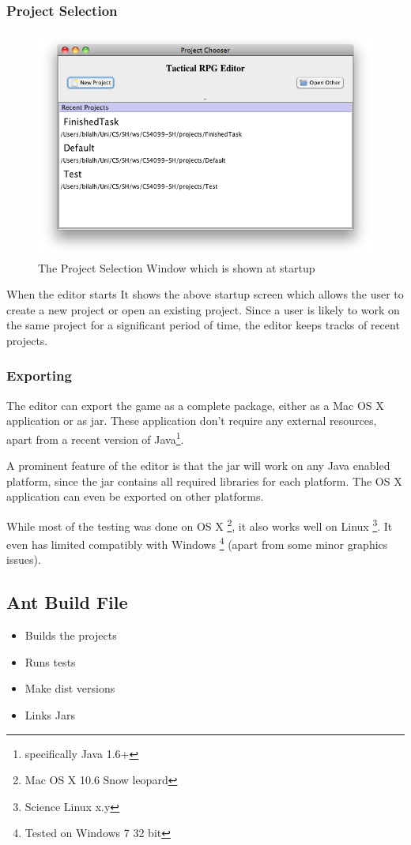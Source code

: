 \subsubsection{Project Selection}
\begin{figure}[htbp]
	\centering
		\includegraphics[width=1.05\textwidth]{figures/editor/Project_Selection.png}
	\caption{The Project Selection Window which is shown at startup}
	\label{fig:figures_editor_Project_Selection}
\end{figure}

When the editor starts It shows the above startup screen which allows the user to create a new project or open an existing project.  Since a user is likely to work on the same project for a significant period of time, the editor keeps tracks of recent projects. 

\clearpage
\subsubsection{Exporting}
\label{ssub:exporting}

The editor can export the game as a complete package, either as a Mac OS X application or as jar. These application don't require any external resources, apart from a recent version of Java\footnote{specifically Java 1.6+}.

A prominent feature of the editor is that the jar will work on any Java enabled platform, since the jar contains all required libraries for each platform. The OS X application can even be exported on other platforms.

While most of the testing was done on OS X \footnote{Mac OS X 10.6 Snow leopard}, it also works well on Linux \footnote{Science  Linux x.y}. It  even has limited compatibly with Windows \footnote{Tested on Windows 7 32 bit} (apart from some minor graphics issues).

\subsection{Ant Build File}
\begin{itemize}
	\item Builds the projects
	\item Runs tests
	\item Make dist versions
	\item Links Jars
\end{itemize}